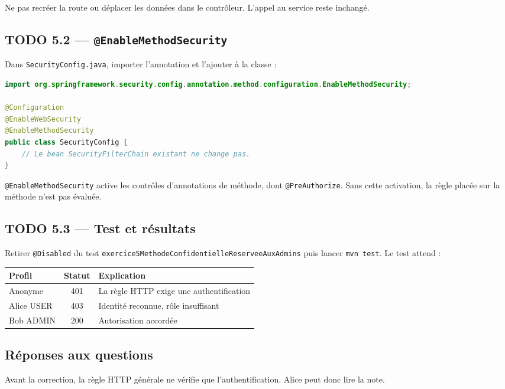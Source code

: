 \documentclass[11pt,a4paper]{article}
\begin{document}
Ne pas recréer la route ou déplacer les données dans le contrôleur. L’appel au service reste inchangé.

\subsection{TODO 5.2 — \texttt{@EnableMethodSecurity}}

Dans \texttt{SecurityConfig.java}, importer l’annotation et l’ajouter à la classe :

\begin{lstlisting}[language=Java]
import org.springframework.security.config.annotation.method.configuration.EnableMethodSecurity;

@Configuration
@EnableWebSecurity
@EnableMethodSecurity
public class SecurityConfig {
    // Le bean SecurityFilterChain existant ne change pas.
}
\end{lstlisting}

\texttt{@EnableMethodSecurity} active les contrôles d’annotations de méthode, dont \texttt{@PreAuthorize}. Sans cette activation, la règle placée sur la méthode n’est pas évaluée.

\subsection{TODO 5.3 — Test et résultats}

Retirer \texttt{@Disabled} du test \texttt{exercice5MethodeConfidentielleReserveeAuxAdmins} puis lancer \texttt{mvn test}. Le test attend :

\begin{center}
\begin{tabular}{l c l}
\toprule
Profil & Statut & Explication \\
\midrule
Anonyme & 401 & La règle HTTP exige une authentification \\
Alice USER & 403 & Identité reconnue, rôle insuffisant \\
Bob ADMIN & 200 & Autorisation accordée \\
\bottomrule
\end{tabular}
\end{center}

\subsection{Réponses aux questions}

Avant la correction, la règle HTTP générale ne vérifie que l’authentification. Alice peut donc lire la note.
\end{document}
